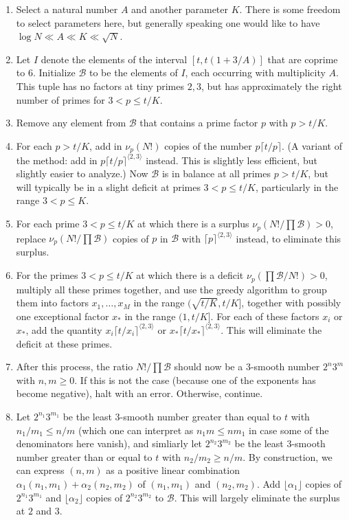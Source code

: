 \documentclass[12pt,a4paper,reqno]{amsart}
\numberwithin{equation}{section}
\theoremstyle{plain}
\theoremstyle{definition}
\newcommand\tuple{{\mathcal B}}
\begin{document}
\begin{enumerate}
\item Select a natural number $A$ and another parameter $K$.  There is some freedom to select parameters here, but generally speaking one would like to have $\log N \ll A \ll K \ll \sqrt{N}$.
\item Let $I$ denote the elements of the interval $[t,t(1+3/A)]$ that are coprime to $6$.  Initialize $\tuple$ to be the elements of $I$, each occurring with multiplicity $A$.  This tuple has no factors at tiny primes $2,3$, but has approximately the right number of primes for $3 < p \leq t/K$.
\item Remove any element from $\tuple$ that contains a prime factor $p$ with $p > t/K$.
\item For each $p > t/K$, add in $\nu_p(N!)$ copies of the number $p \lceil t/p \rceil$.  (A variant of the method: add in $p \lceil t/p \rceil^{\langle 2,3\rangle}$ instead. This is slightly less efficient, but slightly easier to analyze.)  Now $\tuple$ is in balance at all primes $p>t/K$, but will typically be in a slight deficit at primes $3 < p \leq t/K$, particularly in the range $3 < p \leq K$.
\item For each prime $3 < p \leq t/K$ at which there is a surplus $\nu_p(N!/\prod \tuple) > 0$, replace $\nu_p(N!/\prod \tuple)$ copies of $p$ in $\tuple$ with $\lceil p \rceil^{\langle 2,3 \rangle}$ instead, to eliminate this surplus. 
\item For the primes $3 < p \leq t/K$ at which there is a deficit $\nu_p(\prod \tuple/N!) > 0$, multiply all these primes together, and use the greedy algorithm to group them into factors $x_1, \dots, x_M$ in the range
$(\sqrt{t/K}, t/K]$, together with possibly one exceptional factor $x_*$ in the range $(1, t/K]$.  For each of these factors $x_i$ or $x_*$, add the quantity $x_i \lceil t/x_i \rceil^{\langle 2,3 \rangle}$ or $x_* \lceil t/x_* \rceil^{\langle 2,3 \rangle}$.  This will eliminate the deficit at these primes.
\item After this process, the ratio $N!/\prod \tuple$ should now be a $3$-smooth number $2^n 3^m$ with $n,m \geq 0$. If this is not the case (because one of the exponents has become negative), halt with an error.  Otherwise, continue.
\item Let $2^{n_1} 3^{m_1}$ be the least $3$-smooth number greater than equal to $t$ with $n_1/m_1 \leq n/m$ (which one can interpret as $n_1 m \leq nm_1$ in case some of the denominators here vanish), and simliarly let $2^{n_2} 3^{m_2}$ be the least $3$-smooth number greater than or equal to $t$ with $n_2/m_2 \geq n/m$.  By construction, we can express $(n,m)$ as a positive linear combination $\alpha_1 (n_1,m_1) + \alpha_2 (n_2,m_2)$ of $(n_1,m_1)$ and $(n_2,m_2)$.  Add $\lfloor \alpha_1 \rfloor$ copies of $2^{n_1} 3^{m_1}$ and $\lfloor \alpha_2 \rfloor$ copies of $2^{n_2} 3^{m_2}$ to $\tuple$.  This will largely eliminate the surplus at $2$ and $3$.
\end{enumerate}
\end{document}
